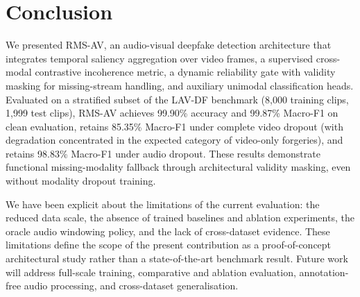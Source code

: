 \documentclass[conference]{IEEEtran}
\begin{document}
\section{Conclusion}

We presented RMS-AV, an audio-visual deepfake detection architecture that integrates temporal saliency aggregation over video frames, a supervised cross-modal contrastive incoherence metric, a dynamic reliability gate with validity masking for missing-stream handling, and auxiliary unimodal classification heads. Evaluated on a stratified subset of the LAV-DF benchmark (8{,}000 training clips, 1{,}999 test clips), RMS-AV achieves 99.90\% accuracy and 99.87\% Macro-F1 on clean evaluation, retains 85.35\% Macro-F1 under complete video dropout (with degradation concentrated in the expected category of video-only forgeries), and retains 98.83\% Macro-F1 under audio dropout. These results demonstrate functional missing-modality fallback through architectural validity masking, even without modality dropout training.

We have been explicit about the limitations of the current evaluation: the reduced data scale, the absence of trained baselines and ablation experiments, the oracle audio windowing policy, and the lack of cross-dataset evidence. These limitations define the scope of the present contribution as a proof-of-concept architectural study rather than a state-of-the-art benchmark result. Future work will address full-scale training, comparative and ablation evaluation, annotation-free audio processing, and cross-dataset generalisation.
\end{document}
